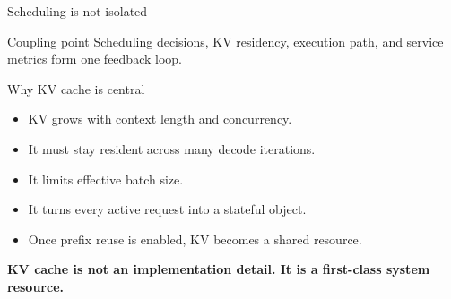 \documentclass[aspectratio=169,11pt]{beamer}
\newcommand{\term}[1]{\textcolor{HUSTBlue}{\textbf{#1}}}
\begin{document}
\begin{frame}{Scheduling is not isolated}
  \centering
  \vspace{0.35cm}
  \begin{block}{Coupling point}
    Scheduling decisions, KV residency, execution path, and service metrics form one feedback loop.
  \end{block}
\end{frame}

\fi

\begin{frame}{Why KV cache is central}
  \begin{itemize}
    \item KV grows with context length and concurrency.
    \item It must stay resident across many decode iterations.
    \item It limits effective batch size.
    \item It turns every active request into a stateful object.
    \item Once prefix reuse is enabled, KV becomes a shared resource.
  \end{itemize}
  \vspace{0.35cm}
  \begin{center}
    \Large\term{KV cache is not an implementation detail. It is a first-class system resource.}
  \end{center}
\end{frame}
\end{document}

